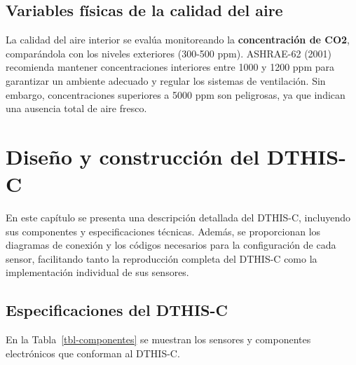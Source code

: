 \documentclass[
  letterpaper,
]{scrbook}
\begin{document}
\section{Variables físicas de la calidad del
aire}\label{variables-fuxedsicas-de-la-calidad-del-aire}

La calidad del aire interior se evalúa monitoreando la
\textbf{concentración de CO2}, comparándola con los niveles exteriores
(300-500 ppm). ASHRAE-62 (2001) recomienda mantener concentraciones
interiores entre 1000 y 1200 ppm para garantizar un ambiente adecuado y
regular los sistemas de ventilación. Sin embargo, concentraciones
superiores a 5000 ppm son peligrosas, ya que indican una ausencia total
de aire fresco.


\chapter{Diseño y construcción del
DTHIS-C}\label{diseuxf1o-y-construcciuxf3n-del-dthis-c}

En este capítulo se presenta una descripción detallada del DTHIS-C,
incluyendo sus componentes y especificaciones técnicas. Además, se
proporcionan los diagramas de conexión y los códigos necesarios para la
configuración de cada sensor, facilitando tanto la reproducción completa
del DTHIS-C como la implementación individual de sus sensores.

\section{Especificaciones del
DTHIS-C}\label{especificaciones-del-dthis-c}

En la Tabla~\ref{tbl-componentes} se muestran los sensores y componentes
electrónicos que conforman al DTHIS-C.
\end{document}
